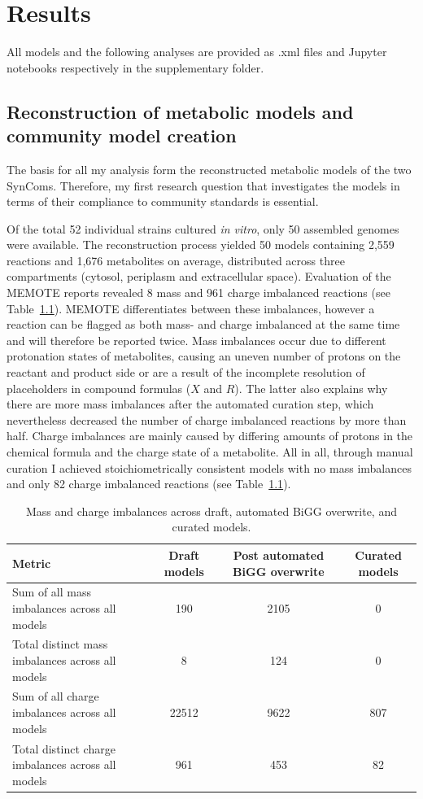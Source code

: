 \chapter{Results}

All models and the following analyses are provided as .xml files and Jupyter notebooks respectively in the supplementary folder.
\section{Reconstruction of metabolic models and community model creation}
The basis for all my analysis form the reconstructed metabolic models of the two SynComs. Therefore, my first research question that investigates the models in terms of their compliance to community standards is essential. 

Of the total 52 individual strains cultured\textit{ in vitro}, only 50 assembled genomes were available. The reconstruction process yielded 50 models containing 2,559 reactions and 1,676 metabolites on average, distributed across three compartments (cytosol, periplasm and extracellular space).
Evaluation of the MEMOTE reports revealed 8 mass and 961 charge imbalanced reactions (see Table~\ref{tab:curation_imbalances}). MEMOTE differentiates between these imbalances, however a reaction can be flagged as both mass- and charge imbalanced at the same time and will therefore be reported twice. Mass imbalances occur due to different protonation states of metabolites, causing an uneven number of protons on the reactant and product side or are a result of the incomplete resolution of placeholders in compound formulas ($X$ and $R$). The latter also explains why there are more mass imbalances after the automated curation step, which nevertheless decreased the number of charge imbalanced reactions by more than half. Charge imbalances are mainly caused by differing amounts of protons in the chemical formula and the charge state of a metabolite. All in all, through manual curation I achieved stoichiometrically consistent models with no mass imbalances and only 82 charge imbalanced reactions (see Table~\ref{tab:curation_imbalances}).

\begin{table}[H]
  \centering
  \caption{Mass and charge imbalances across draft, automated BiGG overwrite, and curated models.}
  \label{tab:curation_imbalances}
  \begin{tabularx}{\linewidth}{Xccc}
    \hline
    \textbf{Metric} & \textbf{Draft models} & \textbf{Post automated BiGG overwrite} & \textbf{Curated models} \\ \hline
    Sum of all mass imbalances across all models & 190 & 2105 & 0 \\
    Total distinct mass imbalances across all models & 8 & 124 & 0 \\
    Sum of all charge imbalances across all models & 22512 & 9622 & 807 \\
    Total distinct charge imbalances across all models & 961 & 453 & 82 \\ \hline
  \end{tabularx}
\end{table}


